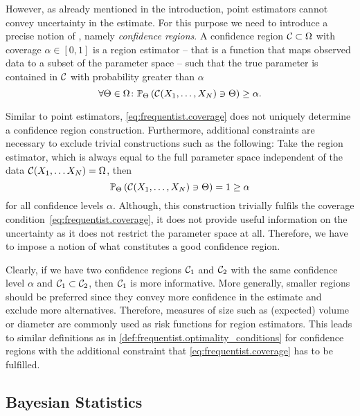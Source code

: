 However, as already mentioned in the introduction, point estimators cannot convey uncertainty in the estimate.
For this purpose we need to introduce a precise notion of , namely \emph{confidence regions}.
A confidence region $\mathcal{C} \subset \Omega$ with coverage $\alpha \in [0,1]$ is a region estimator -- that is a function that maps observed data to a subset of the parameter space -- such that the true parameter is contained in $\mathcal{C}$ with probability greater than $\alpha$
\[
  \label{eq:frequentist.coverage}
  \forall \Theta\in\Omega \colon \mathbb{P}_\Theta\left( \mathcal{C}(X_1, \ldots, X_N) \ni \Theta \right) \ge \alpha.
\]

Similar to point estimators, \cref{eq:frequentist.coverage} does not uniquely determine a confidence region construction.
Furthermore, additional constraints are necessary to exclude trivial constructions such as the following:
Take the region estimator, which is always equal to the full parameter space independent of the data $\mathcal{C}(X_1, \ldots X_N) = \Omega$, then
\[
  \mathbb{P}_\Theta\left(  \mathcal{C}(X_1, \ldots, X_N) \ni \Theta  \right) = 1 \ge \alpha
\]
for all confidence levels $\alpha$.
Although, this construction trivially fulfils the coverage condition~\eqref{eq:frequentist.coverage}, it does not provide useful information on the uncertainty as it does not restrict the parameter space at all.
Therefore, we have to impose a notion of what constitutes a good confidence region.

Clearly, if we have two confidence regions $\mathcal{C}_1$ and $\mathcal{C}_2$ with the same confidence level $\alpha$ and $\mathcal{C}_1 \subset \mathcal{C}_2$, then $\mathcal{C}_1$ is more informative.
More generally, smaller regions should be preferred since they convey more confidence in the estimate and exclude more alternatives.
Therefore, measures of size such as (expected) volume or diameter are commonly used as risk functions for region estimators.
This leads to similar definitions as in \cref{def:frequentist.optimality_conditions} for confidence regions with the additional constraint that \cref{eq:frequentist.coverage} has to be fulfilled.



\subsection{Bayesian Statistics}
\label{sub:intro.bayesian}


